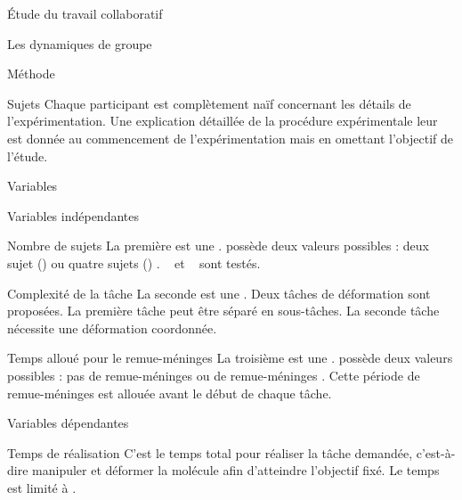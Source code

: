 \documentclass[myfrancais]{mythesis}
\begin{document}
\begin{mypart}{Étude du travail collaboratif}
\begin{mychapter}{Les dynamiques de groupe}
\begin{mysection}{Méthode}
\begin{mysubsection}{Sujets}
					Chaque participant est complètement naïf concernant les détails de l'expérimentation.
					Une explication détaillée de la procédure expérimentale leur est donnée au commencement de l'expérimentation mais en omettant l'objectif de l'étude.
				\end{mysubsection}
				\begin{mysubsection}{Variables}
					\begin{mysubsubsection}{Variables indépendantes}
						\begin{myparagraph}{ Nombre de sujets}
							La première  est une .
							 possède deux valeurs possibles : \og deux sujet (\mycf {}) \fg ou \og quatre sujets (\mycf {}) \fg.
							~ et ~ sont testés.
						\end{myparagraph}
						\begin{myparagraph}{ Complexité de la tâche}
							La seconde  est une .
							Deux tâches de déformation sont proposées.
							La première tâche peut être séparé en sous-tâches.
							La seconde tâche nécessite une déformation coordonnée.
						\end{myparagraph}
						\begin{myparagraph}{ Temps alloué pour le remue-méninges}
							La troisième  est une .
							 possède deux valeurs possibles : \og pas de remue-méninges \fg ou \og {} de remue-méninges \fg.
							Cette période de remue-méninges est allouée avant le début de chaque tâche.
						\end{myparagraph}
					\end{mysubsubsection}
					\begin{mysubsubsection}{Variables dépendantes}
						\begin{myparagraph}{ Temps de réalisation}
							C'est le temps total pour réaliser la tâche demandée, c'est-à-dire manipuler et déformer la molécule afin d'atteindre l'objectif fixé.
							Le temps est limité à .
						\end{myparagraph}

\end{mysubsubsection}
\end{mysubsection}
\end{mysection}
\end{mychapter}
\end{mypart}
\end{document}

